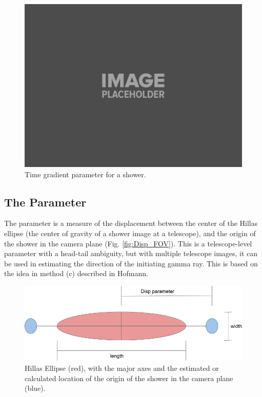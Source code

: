 \documentclass[main.tex]{subfiles}
\begin{document}
\begin{figure}[htbp]
  \centering
  \includegraphics[width=0.45\linewidth]{images/placeholder}
  \caption[Time gradient parameter.]{Time gradient parameter for a shower.}
  \label{fig:time_gradient}
\end{figure}

\subsection{The \disp Parameter}
The \disp parameter is a measure of the displacement between the center of the Hillas ellipse (the center of gravity of a shower image at a telescope), and the origin of the shower in the camera plane (Fig. \ref{fig:Disp_FOV}). This is a telescope-level parameter with a head-tail ambiguity, but with multiple telescope images, it can be used in estimating the direction of the initiating gamma ray. This is based on the idea in method (c) described in Hofmann\cite{Hofmann:1999dx}.
\begin{figure}[htbp]
  \centering
  \includegraphics[width=.58\linewidth]{images/Disp_param}
  \caption[The Hillas ellipse.]{Hillas Ellipse (red), with the major axes and the estimated or calculated location of the origin of the shower in the camera plane (blue).}
  \label{fig:hillas_ellipse}
\end{figure}
\end{document}
